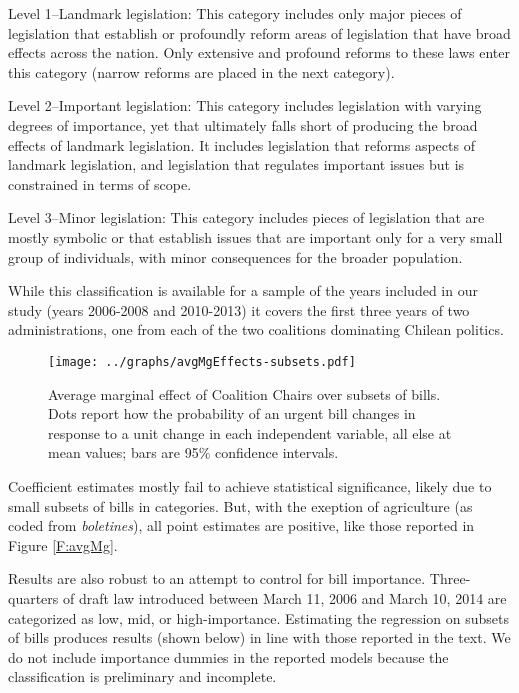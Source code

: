 \documentclass[letter,12pt]{article}
\begin{document}
Level 1--Landmark legislation: This category includes only major pieces of legislation that establish or profoundly reform areas of legislation that have broad effects across the nation. Only extensive and profound reforms to these laws enter this category (narrow reforms are placed in the next category). 

Level 2--Important legislation: This category includes legislation with varying degrees of importance, yet that ultimately falls short of producing the broad effects of landmark legislation. It includes legislation that reforms aspects of landmark legislation, and legislation that regulates important issues but is constrained in terms of scope. 

Level 3--Minor legislation: This category includes pieces of legislation that are mostly symbolic or that establish issues that are important only for a very small group of individuals, with minor consequences for the broader population. 

While this classification is available for a sample of the years included in our study (years 2006-2008 and 2010-2013) it covers the first three years of two administrations, one from each of the two coalitions dominating Chilean politics.



\begin{figure}
  \centering
    \caption{Average marginal effect of Coalition Chairs over subsets of bills. Dots report how the probability of an urgent bill changes in response to a unit change in each independent variable, all else at mean values; bars are 95\% confidence intervals.}\label{F:avgMgSub}
    \texttt{[image: ../graphs/avgMgEffects-subsets.pdf]}
\end{figure}

Coefficient estimates mostly fail to achieve statistical significance, likely due to small subsets of bills in categories. But, with the exeption of agriculture (as coded from \emph{boletines}), all point estimates are positive, like those reported in Figure \ref{F:avgMg}. 

Results are also robust to an attempt to control for bill importance. Three-quarters of draft law introduced between March 11, 2006 and March 10, 2014 are categorized as low, mid, or high-importance. Estimating the regression on subsets of bills produces results (shown below) in line with those reported in the text. We do not include importance dummies in the reported models because the classification is preliminary and incomplete. 
\end{document}
